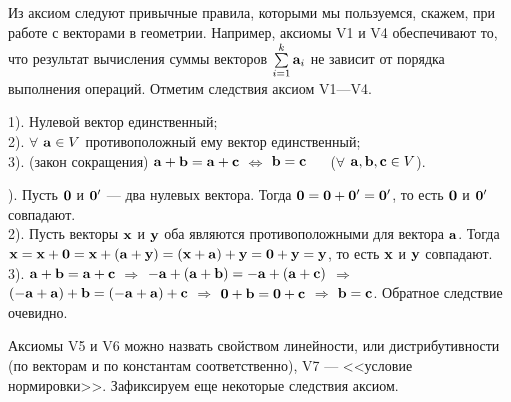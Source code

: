Из аксиом следуют привычные правила, которыми мы пользуемся, скажем, при работе с векторами в геометрии.
Например, аксиомы V1 и V4 обеспечивают то, что результат вычисления
суммы векторов $\sum\limits_{i=1}^{k} \mathbf{a}_i$ 
не зависит от порядка выполнения операций.
Отметим следствия аксиом V1---V4.

\begin{predl}\label{sled_aksiom}
1). Нулевой вектор единственный;\\
2). $\forall$ $\mathbf{a}\in V$ противоположный ему вектор единственный;\\
3). (закон сокращения)
$\mathbf{a}+\mathbf{b}=\mathbf{a}+\mathbf{c}$
$\Leftrightarrow$ $\mathbf{b}=\mathbf{c}$ \,\,\,\,\,\, ($\forall$ $\mathbf{a}, \mathbf{b}, \mathbf{c} \in V$).
\end{predl}
). Пусть $\mathbf{0}$ и $\mathbf{0'}$ --- два нулевых вектора. Тогда $\mathbf{0} = \mathbf{0} + \mathbf{0'}= \mathbf{0'}$, то есть $\mathbf{0}$ и $\mathbf{0'}$ совпадают.
\\
2). Пусть векторы $\mathbf{x}$ и $\mathbf{y}$ оба являются противоположными для вектора $\mathbf{a}$.  
Тогда $\vek{x} = \vek{x} + \vek{0}  = \vek{x} + (\vek{a} + \vek{y})  = (\vek{x} + \vek{a}) + \vek{y} = \vek{0}+\vek{y} \hm=\vek{y}$, 
то есть $\mathbf{x}$ и $\mathbf{y}$ совпадают.
\\
3). $\mathbf{a}+\mathbf{b}=\mathbf{a}+\mathbf{c}$ $\Rightarrow$ $-\mathbf{a}+(\mathbf{a}+\mathbf{b})=-\mathbf{a}+(\mathbf{a}+\mathbf{c})$
$\Rightarrow$ $(-\mathbf{a}+\mathbf{a})+\mathbf{b}=(-\mathbf{a}+\mathbf{a})+\mathbf{c}$
$\Rightarrow$ $\mathbf{0}+\mathbf{b}=\mathbf{0}+\mathbf{c}$
$\Rightarrow$ $\mathbf{b}=\mathbf{c}$.
Обратное следствие очевидно.
\edok

\otstup
Аксиомы V5 и V6 можно назвать свойством линейности, или дистрибутивности (по векторам и по константам соответственно),
V7 --- <<условие нормировки>>. Зафиксируем еще некоторые следствия аксиом.

